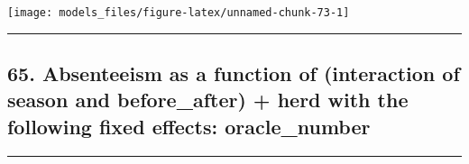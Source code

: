 \documentclass[]{article}
\begin{document}
\begin{center}\texttt{[image: models\_files/figure-latex/unnamed-chunk-73-1]} \end{center}

\newpage

\begin{center}\rule{0.5\linewidth}{\linethickness}\end{center}

\subsection{65. Absenteeism as a function of (interaction of season and
before\_after) + herd with the following fixed effects:
oracle\_number}\label{absenteeism-as-a-function-of-interaction-of-season-and-before_after-herd-with-the-following-fixed-effects-oracle_number-1}

\begin{center}\rule{0.5\linewidth}{\linethickness}\end{center}
\end{document}
